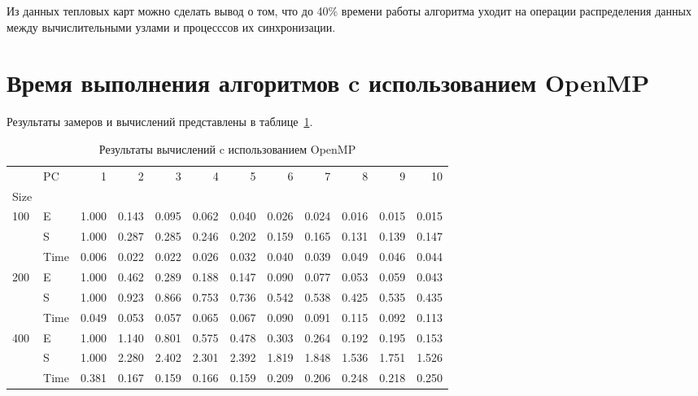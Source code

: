 Из данных тепловых карт можно сделать вывод о том, что до 40\% времени работы алгоритма уходит на операции распределения данных между вычислительными узлами и процесссов их синхронизации.


\section{Время выполнения алгоритмов c использованием OpenMP}

Результаты замеров и вычислений представлены в таблице~\ref{tab:results-all-m-2}.


\begin{table}[H]
    \center

    \caption{Результаты вычислений c использованием OpenMP}
    \label{tab:results-all-m-2}
    \fontsize{11pt}{11pt}\selectfont
    \begin{tabular}{|l|l|rrrrrrrrrr|}
        \hline
        & PC   & 1      & 2     & 3     & 4     & 5     & 6     & 7     & 8     & 9     & 10    \\
        Size                     &      &        &       &       &       &       &       &       &       &       &       \\
        \hline
        \multirow[t]{3}{*}{100}  & E    & 1.000  & 0.143 & 0.095 & 0.062 & 0.040 & 0.026 & 0.024 & 0.016 & 0.015 & 0.015 \\
        & S    & 1.000  & 0.287 & 0.285 & 0.246 & 0.202 & 0.159 & 0.165 & 0.131 & 0.139 & 0.147 \\
        & Time & 0.006  & 0.022 & 0.022 & 0.026 & 0.032 & 0.040 & 0.039 & 0.049 & 0.046 & 0.044 \\
        \cline{1-12}
        \multirow[t]{3}{*}{200}  & E    & 1.000  & 0.462 & 0.289 & 0.188 & 0.147 & 0.090 & 0.077 & 0.053 & 0.059 & 0.043 \\
        & S    & 1.000  & 0.923 & 0.866 & 0.753 & 0.736 & 0.542 & 0.538 & 0.425 & 0.535 & 0.435 \\
        & Time & 0.049  & 0.053 & 0.057 & 0.065 & 0.067 & 0.090 & 0.091 & 0.115 & 0.092 & 0.113 \\
        \cline{1-12}
        \multirow[t]{3}{*}{400}  & E    & 1.000  & 1.140 & 0.801 & 0.575 & 0.478 & 0.303 & 0.264 & 0.192 & 0.195 & 0.153 \\
        & S    & 1.000  & 2.280 & 2.402 & 2.301 & 2.392 & 1.819 & 1.848 & 1.536 & 1.751 & 1.526 \\
        & Time & 0.381  & 0.167 & 0.159 & 0.166 & 0.159 & 0.209 & 0.206 & 0.248 & 0.218 & 0.250 \\

\end{tabular}
\end{table}
